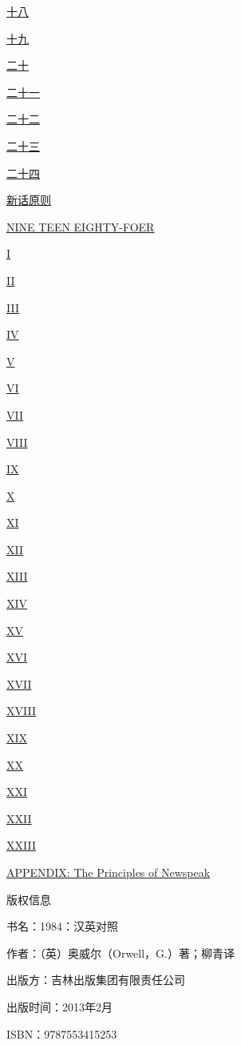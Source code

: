 \hyperref[ux5341ux516b]{十八}

\hyperref[ux5341ux4e5d]{十九}

\hyperref[ux4e8cux5341]{二十}

\hyperref[ux4e8cux5341ux4e00]{二十一}

\hyperref[ux4e8cux5341ux4e8c]{二十二}

\hyperref[ux4e8cux5341ux4e09]{二十三}

\hyperref[ux4e8cux5341ux56db]{二十四}

\hyperref[ux65b0ux8bddux539fux5219]{新话原则}

\hyperref[i]{NINE TEEN EIGHTY-FOER}

\hyperref[i]{I}

\hyperref[ii]{II}

\hyperref[iii]{III}

\hyperref[iv]{IV}

\hyperref[v]{V}

\hyperref[vi]{VI}

\hyperref[vii]{VII}

\hyperref[viii]{VIII}

\hyperref[ix]{IX}

\hyperref[x]{X}

\hyperref[xi]{XI}

\hyperref[xii]{XII}

\hyperref[xiii]{XIII}

\hyperref[xiv]{XIV}

\hyperref[xv]{XV}

\hyperref[xvi]{XVI}

\hyperref[xvii]{XVII}

\hyperref[xviii]{XVIII}

\hyperref[xix]{XIX}

\hyperref[xx]{XX}

\hyperref[xxi]{XXI}

\hyperref[xxii]{XXII}

\hyperref[xxiii]{XXIII}

\hyperref[appendix-the-principles-of-newspeak]{APPENDIX: The Principles
of Newspeak}

版权信息

书名：1984：汉英对照

作者：（英）奥威尔（Orwell，G.）著；柳青译

出版方：吉林出版集团有限责任公司

出版时间：2013年2月

ISBN：9787553415253

